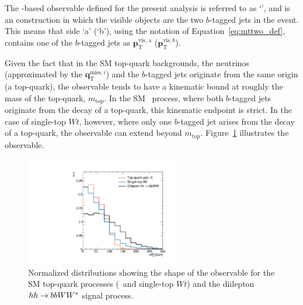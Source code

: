 The \mttwo-based observable defined for the present analysis is referred to as `\mtbb',
and is an \mttwo construction in which the visible objects are the two $b$-tagged jets in the event.
This means that side `a' (`b'), using the notation of Equation~\ref{eq:mttwo_def}, contains
one of the $b$-tagged jets as $\bm{p}_{\text{T}}^{\text{vis, a}}$ ($\bm{p}_{\text{T}}^{\text{vis}, b}$).

Given the fact that in the SM top-quark backgrounds, the neutrinos (approximated by the $\bm{q}_{\text{T}}^{\text{miss}, i}$)
and the $b$-tagged jets originate from the same origin (a top-quark), the \mtbb observable tends
to have a kinematic bound at roughly the mass of the top-quark, $m_{\text{top}}$.
In the SM \ttbar~process, where both $b$-tagged jets originate from the decay of a top-quark, this kinematic
endpoint is strict.
In the case of single-top $Wt$, however, where only one $b$-tagged jet arises from the decay of a
top-quark, the \mtbb observable can extend beyond $m_{\text{top}}$.
Figure~\ref{fig:hh_shape_mtbb} illustrates the \mtbb observable.

\begin{figure}[!htb]
    \begin{center}
        \includegraphics[width=0.6\textwidth]{figures/search_hh/signal_pheno/shape_plots/hh_shape_plot_mt2_bb}
        \caption{
            Normalized distributions showing the shape of the \mtbb observable for the SM
            top-quark processes (\ttbar~and single-top $Wt$) and the diilepton $hh \rightarrow bbWW^*$ signal process.
        }
        \label{fig:hh_shape_mtbb}
    \end{center}
\end{figure}


